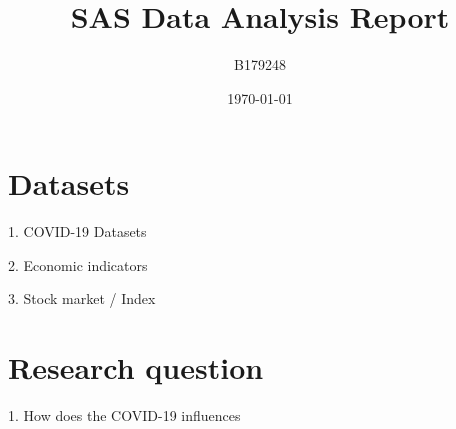 \documentclass{report}
\title{SAS Data Analysis Report}
\author{B179248}
\date{\today}
\begin{document}
\maketitle
\section{Datasets}
1. COVID-19 Datasets\par
2. Economic indicators\par
3. Stock market / Index
\section{Research question}
1. How does the COVID-19 influences 
\end{document}
